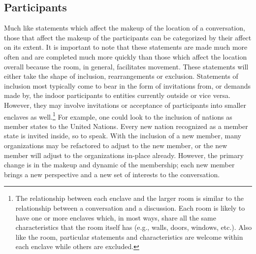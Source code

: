 \documentclass[openany,twoside]{memoir}
\begin{document}
\begin{Spacing}{2}
\subsection{Participants}
Much like statements which affect the makeup of the location of a conversation, those that affect the makeup of the participants can be categorized by their affect on its extent.
It is important to note that these statements are made much more often and are completed much more quickly than those which affect the location overall because the room, in general, facilitates movement.
These statements will either take the shape of inclusion, rearrangements or exclusion.
Statements of inclusion most typically come to bear in the form of invitations from, or demands made by, the indoor participants to entities currently outside or vice versa.
However, they may involve invitations or acceptance of participants into smaller enclaves as well.\footnote{
The relationship between each enclave and the larger room is similar to the relationship between a conversation and a discussion.
Each room is likely to have one or more enclaves which, in most ways, share all the same characteristics that the room itself has (e.g., walls, doors, windows, etc.).
Also like the room, particular statements and characteristics are welcome within each enclave while others are excluded.}
For example, one could look to the inclusion of nations as member states to the United Nations.
Every new nation recognized as a member state is invited inside, so to speak.
With the inclusion of a new member, many organizations may be refactored to adjust to the new member, or the new member will adjust to the organizations in-place already.
However, the primary change is in the makeup and dynamic of the membership; each new member brings a new perspective and a new set of interests to the conversation.


\end{Spacing}
\end{document}

